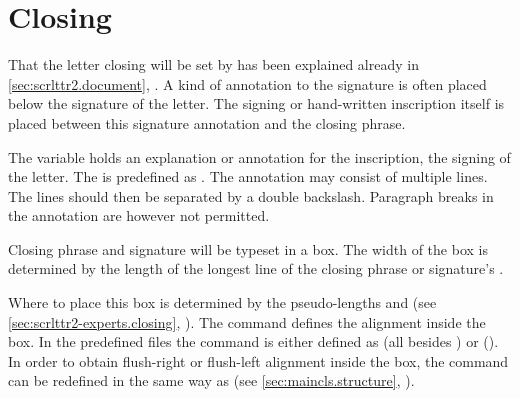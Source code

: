 \section{Closing}
\BeginIndexGroup%
%
%
%
%

That the letter closing will be set by  has
been explained already in \autoref{sec:scrlttr2.document},
. A kind of annotation to the signature
is often placed below the signature of the letter. The signing or hand-written
inscription itself is placed between this signature annotation and the closing
phrase.

\begin{Declaration}
\end{Declaration}
The variable  holds an explanation or annotation for the
inscription, the signing of the letter. The  is predefined as
.  The annotation may consist
of multiple lines. The lines should then be separated by a double
backslash. Paragraph breaks in the annotation are however
not permitted.%
\EndIndexGroup


\begin{Declaration}
\end{Declaration}
Closing phrase and signature will be typeset in a box. The width of
the box is determined by the length of the longest line of the closing
phrase or signature's .

Where to place this box is determined by the pseudo-lengths
 and
 (see
\autoref{sec:scrlttr2-experts.closing},
). The command
 defines the alignment inside the box. In the
predefined  files the command is either defined as 
(all besides ) or  ().  In
order to obtain flush-right or flush-left alignment inside the box, the
command can be redefined in the same way as
 (see \autoref{sec:maincls.structure},
).

